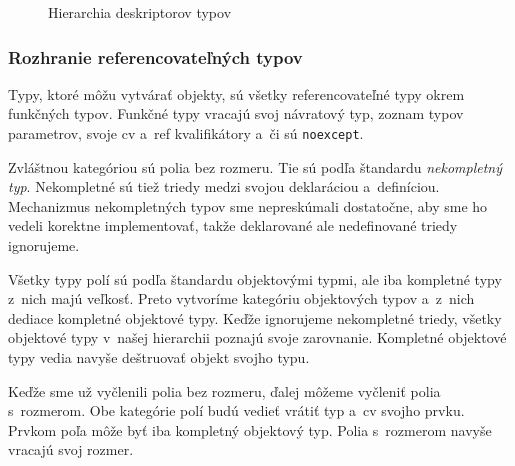 \begin{figure}[H]
\begin{center}
\caption{Hierarchia deskriptorov typov}
\end{center}
\end{figure}

\subsubsection{Rozhranie referencovateľných typov}

Typy, ktoré môžu vytvárať objekty, sú všetky referencovateľné typy okrem funkčných typov. Funkčné typy vracajú svoj návratový typ, zoznam typov parametrov, svoje cv a~ref kvalifikátory a~či sú \texttt{noexcept}.

Zvláštnou kategóriou sú polia bez rozmeru. Tie sú podľa štandardu \emph{nekompletný typ}. Nekompletné sú tiež triedy medzi svojou deklaráciou a~definíciou. Mechanizmus nekompletných typov sme nepreskúmali dostatočne, aby sme ho vedeli korektne implementovať, takže deklarované ale nedefinované triedy ignorujeme.

Všetky typy polí sú podľa štandardu objektovými typmi, ale iba kompletné typy z~nich majú veľkosť. Preto vytvoríme kategóriu objektových typov a~z~nich dediace kompletné objektové typy. Keďže ignorujeme nekompletné triedy, všetky objektové typy v~našej hierarchii poznajú svoje zarovnanie. Kompletné objektové typy vedia navyše deštruovať objekt svojho typu.

Keďže sme už vyčlenili polia bez rozmeru, ďalej môžeme vyčleniť polia s~rozmerom. Obe kategórie polí budú vedieť vrátiť typ a~cv svojho prvku. Prvkom poľa môže byť iba kompletný objektový typ. Polia s~rozmerom navyše vracajú svoj rozmer.

